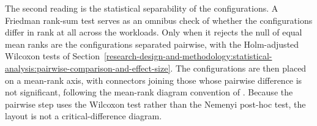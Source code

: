 The second reading is the statistical separability of the configurations. A Friedman rank-sum test \parencite{friedman1937_use_of_ranks} serves as an omnibus check of whether the configurations differ in rank at all across the workloads. Only when it rejects the null of equal mean ranks are the configurations separated pairwise, with the Holm-adjusted Wilcoxon tests of Section~\ref{research-design-and-methodology:statistical-analysis:pairwise-comparison-and-effect-size}. The configurations are then placed on a mean-rank axis, with connectors joining those whose pairwise difference is not significant, following the mean-rank diagram convention of \textcite{demsar2006_statistical_comparisons_classifiers}. Because the pairwise step uses the Wilcoxon test rather than the Nemenyi post-hoc test, the layout is not a critical-difference diagram.